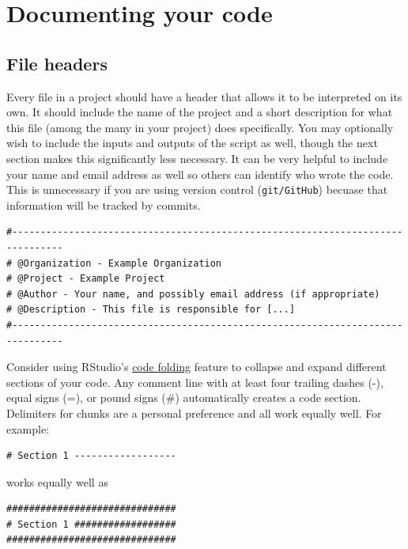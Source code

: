 \documentclass[
]{book}
\begin{document}
\section{Documenting your code}\label{documenting-your-code}

\subsection{File headers}\label{file-headers}

Every file in a project should have a header that allows it to be interpreted on its own. It should include the name of the project and a short description for what this file (among the many in your project) does specifically. You may optionally wish to include the inputs and outputs of the script as well, though the next section makes this significantly less necessary. It can be very helpful to include your name and email address as well so others can identify who wrote the code. This is unnecessary if you are using version control (\texttt{git/GitHub}) becuase that information will be tracked by commits.

\begin{verbatim}
#-------------------------------------------------------------------------------
# @Organization - Example Organization
# @Project - Example Project
# @Author - Your name, and possibly email address (if appropriate)
# @Description - This file is responsible for [...]
#-------------------------------------------------------------------------------
\end{verbatim}

Consider using RStudio's \href{https://support.rstudio.com/hc/en-us/articles/200484568-Code-Folding-and-Sections}{code folding} feature to collapse and expand different sections of your code. Any comment line with at least four trailing dashes (-), equal signs (=), or pound signs (\#) automatically creates a code section. Delimiters for chunks are a personal preference and all work equally well. For example:

\begin{verbatim}
# Section 1 ------------------
\end{verbatim}

works equally well as

\begin{verbatim}
##############################
# Section 1 ##################
##############################
\end{verbatim}
\end{document}

